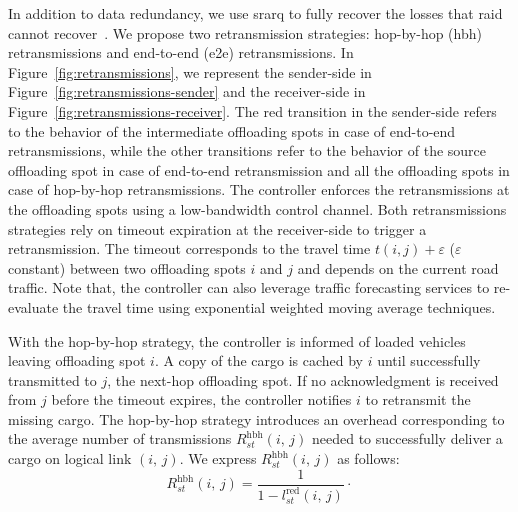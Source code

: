 In addition to data redundancy, we use \acrfull{srarq} to fully recover the losses that \acrshort{raid} cannot recover~\cite{costello2004error}. We propose two retransmission strategies: hop-by-hop (hbh) retransmissions and end-to-end (e2e) retransmissions. In Figure~\ref{fig:retransmissions}, we represent the sender-side in Figure~\ref{fig:retransmissions-sender} and the receiver-side in Figure~\ref{fig:retransmissions-receiver}. The red transition in the sender-side refers to the behavior of the intermediate offloading spots in case of end-to-end retransmissions, while the other transitions refer to the behavior of the source offloading spot in case of end-to-end retransmission and all the offloading spots in case of hop-by-hop retransmissions. The controller enforces the retransmissions at the offloading spots using a low-bandwidth control channel. Both retransmissions strategies rely on timeout expiration at the receiver-side to trigger a retransmission. The timeout corresponds to the travel time $t(i,j)+\varepsilon$ ($\varepsilon$ constant) between two offloading spots $i$ and $j$ and depends on the current road traffic. Note that, the controller can also leverage traffic forecasting services to re-evaluate the travel time using exponential weighted moving average techniques.

With the hop-by-hop strategy, the controller is informed of loaded vehicles leaving offloading spot $i$. A copy of the cargo is cached by $i$ until successfully transmitted to $j$, the next-hop offloading spot. If no acknowledgment is received from $j$ before the timeout expires, the controller notifies $i$ to retransmit the missing cargo.  The hop-by-hop strategy introduces an overhead corresponding to the average number of transmissions $R^{\textrm{hbh}}_{st}(i,\,j)$ needed to successfully deliver a cargo on logical link $(i,\,j)$. We express $R^{\textrm{hbh}}_{st}(i,\,j)$ as follows:
\begin{equation}
    R_{st}^{\textrm{hbh}}(i,\,j) =  \frac{1}{1-l_{st}^{\text{red}}(i,\,j)}\cdot
\end{equation}

